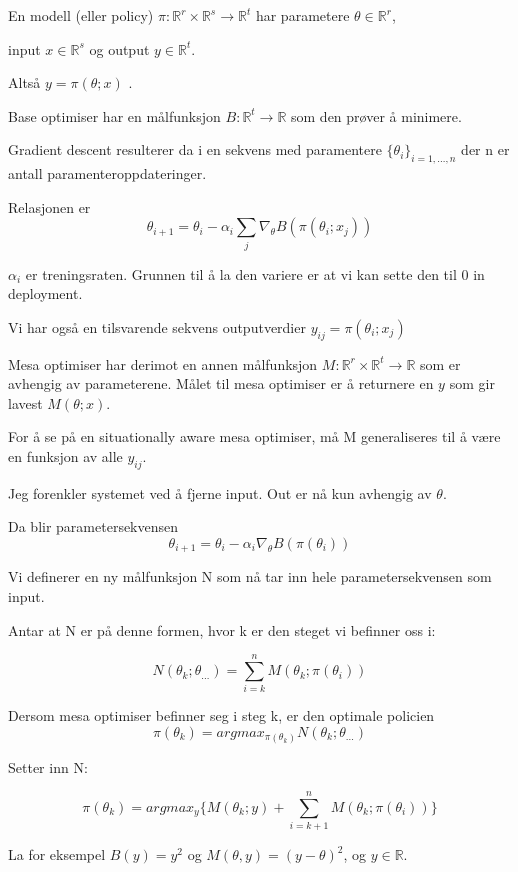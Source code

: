 \documentclass[11pt]{article}
\begin{document}
En modell (eller policy) \(\pi \colon \mathbb{R}^r \times \mathbb{R}^s \longrightarrow \mathbb{R}^t\) har parametere
    \(\theta \in \mathbb{R}^r\),

input \(x \in \mathbb{R}^s\) og output \(y \in \mathbb{R}^t\).

Altså \(y = \pi(\theta;x)\) .

Base optimiser har en målfunksjon \(B \colon \mathbb{R}^t \longrightarrow \mathbb{R}\) som den prøver å minimere.

Gradient descent resulterer da i en sekvens med paramentere \(\{\theta_i\}_{i=1,\dots,n}\) der n er antall paramenteroppdateringer.

Relasjonen er \[\theta_{i+1} = \theta_i - \alpha_i \sum_{j} \nabla_\theta B(\pi(\theta_i; x_j))\]

\(\alpha_i\) er treningsraten.
Grunnen til å la den variere er at vi kan sette den til 0 in deployment.

Vi har også en tilsvarende sekvens outputverdier \(y_{ij} = \pi(\theta_i; x_j)\)

Mesa optimiser har derimot en annen målfunksjon \(M \colon \mathbb{R}^r \times \mathbb{R}^t \longrightarrow \mathbb{R}\)
    som er avhengig av parameterene.
Målet til mesa optimiser er å returnere en \(y\) som gir lavest \(M(\theta; x)\).

For å se på en situationally aware mesa optimiser, må M generaliseres til å være en funksjon av alle \(y_{ij}\).

Jeg forenkler systemet ved å fjerne input. Out er nå kun avhengig av \(\theta\).

Da blir parametersekvensen \[\theta_{i+1} = \theta_i - \alpha_i \nabla_\theta B(\pi(\theta_i))\]

Vi definerer en ny målfunksjon N som nå tar inn hele parametersekvensen som input.

Antar at N er på denne formen, hvor k er den steget vi befinner oss i:

\[N(\theta_k;\theta_{\dots}) = \sum_{i=k}^{n} M(\theta_k;\pi(\theta_i))\]

Dersom mesa optimiser befinner seg i steg k, er den optimale policien
\[
    \pi(\theta_k) = argmax_{\pi(\theta_k)} N(\theta_k;\theta_{\dots})
\]

Setter inn N:

\[
    \pi(\theta_k) = argmax_{y} \{M(\theta_k;y) + \sum_{i=k+1}^{n} M(\theta_k;\pi(\theta_i))    \}
\]

La for eksempel \(B(y) = y^2\) og \(M(\theta, y) = (y - \theta)^2\), og \(y \in \mathbb{R}\).
\end{document}
